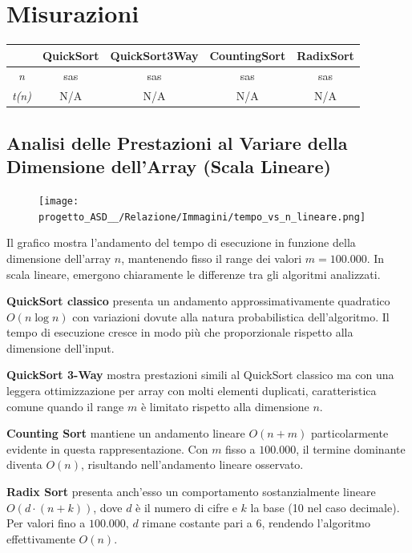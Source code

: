 \documentclass[a4paper, 11pt]{article}
\begin{document}
\section{Misurazioni}

\begin{table} [H]
    \centering
    \begin{tabular}{|c||c|c|c|c|}
        \hline
        & \textbf{QuickSort} & \textbf{QuickSort3Way} & \textbf{CountingSort} & \textbf{RadixSort}\\ [0.1 cm]
        \hline
        \textit{n} & sas & sas & sas & sas\\
        \hline
        \textit{t(n)} & N/A & N/A & N/A & N/A\\
        \hline
    \end{tabular}
\end{table}

\subsection{Analisi delle Prestazioni al Variare della Dimensione dell'Array (Scala Lineare)}
\begin{figure}[H]
    \centering
    \texttt{[image: progetto\_ASD\_\_/Relazione/Immagini/tempo\_vs\_n\_lineare.png]}
    \label{fig:grafico}
\end{figure}

Il grafico mostra l'andamento del tempo di esecuzione in funzione della dimensione dell'array $n$, mantenendo fisso il range dei valori $m = 100.000$. In scala lineare, emergono chiaramente le differenze tra gli algoritmi analizzati.

\textbf{QuickSort classico} presenta un andamento approssimativamente quadratico $O(n \log n)$ con variazioni dovute alla natura probabilistica dell'algoritmo. Il tempo di esecuzione cresce in modo più che proporzionale rispetto alla dimensione dell'input.

\textbf{QuickSort 3-Way} mostra prestazioni simili al QuickSort classico ma con una leggera ottimizzazione per array con molti elementi duplicati, caratteristica comune quando il range $m$ è limitato rispetto alla dimensione $n$.

\textbf{Counting Sort} mantiene un andamento lineare $O(n + m)$ particolarmente evidente in questa rappresentazione. Con $m$ fisso a $100.000$, il termine dominante diventa $O(n)$, risultando nell'andamento lineare osservato.

\textbf{Radix Sort} presenta anch'esso un comportamento sostanzialmente lineare $O(d \cdot (n + k))$, dove $d$ è il numero di cifre e $k$ la base (10 nel caso decimale). Per valori fino a $100.000$, $d$ rimane costante pari a 6, rendendo l'algoritmo effettivamente $O(n)$.
\end{document}
